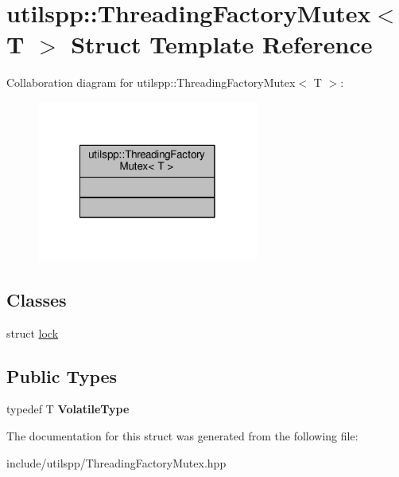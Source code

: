 \hypertarget{structutilspp_1_1ThreadingFactoryMutex}{\section{utilspp\-:\-:Threading\-Factory\-Mutex$<$ T $>$ Struct Template Reference}
\label{structutilspp_1_1ThreadingFactoryMutex}
}


Collaboration diagram for utilspp\-:\-:Threading\-Factory\-Mutex$<$ T $>$\-:
\nopagebreak
\begin{figure}[H]
\begin{center}
\leavevmode
\includegraphics[width=206pt]{structutilspp_1_1ThreadingFactoryMutex__coll__graph}
\end{center}
\end{figure}
\subsection*{Classes}
\begin{DoxyCompactItemize}
\item 
struct \hyperlink{structutilspp_1_1ThreadingFactoryMutex_1_1lock}{lock}
\end{DoxyCompactItemize}
\subsection*{Public Types}
\begin{DoxyCompactItemize}
\item 
\hypertarget{structutilspp_1_1ThreadingFactoryMutex_afdadf1959c497182105f8196b02a8656}{typedef T {\bfseries Volatile\-Type}}\label{structutilspp_1_1ThreadingFactoryMutex_afdadf1959c497182105f8196b02a8656}

\end{DoxyCompactItemize}


The documentation for this struct was generated from the following file\-:\begin{DoxyCompactItemize}
\item 
include/utilspp/Threading\-Factory\-Mutex.\-hpp\end{DoxyCompactItemize}
